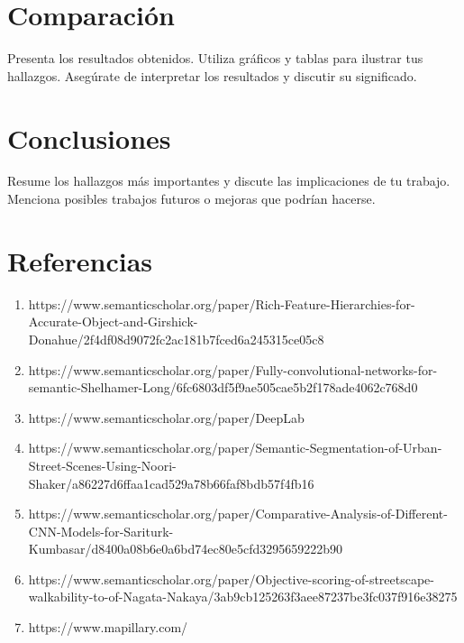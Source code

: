 \documentclass{article}
\begin{document}
\section{Comparaci\'on}
Presenta los resultados obtenidos. Utiliza gráficos y tablas para ilustrar tus hallazgos. Asegúrate de interpretar los resultados y discutir su significado.

\section{Conclusiones}
Resume los hallazgos más importantes y discute las implicaciones de tu trabajo. Menciona posibles trabajos futuros o mejoras que podrían hacerse.

\section*{Referencias}
\begin{enumerate}
    \item https://www.semanticscholar.org/paper/Rich-Feature-Hierarchies-for-Accurate-Object-and-Girshick-Donahue/2f4df08d9072fc2ac181b7fced6a245315ce05c8
    \item https://www.semanticscholar.org/paper/Fully-convolutional-networks-for-semantic-Shelhamer-Long/6fc6803df5f9ae505cae5b2f178ade4062c768d0
    \item https://www.semanticscholar.org/paper/DeepLab%
    \item https://www.semanticscholar.org/paper/Semantic-Segmentation-of-Urban-Street-Scenes-Using-Noori-Shaker/a86227d6ffaa1cad529a78b66faf8bdb57f4fb16\
    \item https://www.semanticscholar.org/paper/Comparative-Analysis-of-Different-CNN-Models-for-Sariturk-Kumbasar/d8400a08b6e0a6bd74ec80e5cfd3295659222b90
    \item https://www.semanticscholar.org/paper/Objective-scoring-of-streetscape-walkability-to-of-Nagata-Nakaya/3ab9cb125263f3aee87237be3fc037f916e38275
    \item https://www.mapillary.com/
\end{enumerate}
\end{document}
